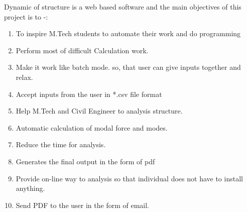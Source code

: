 Dynamic of structure is a web based software and the 
main objectives of this project is to -:
\begin{enumerate}
\item To inspire M.Tech students to automate their work and do programming 
\item Perform most of difficult Calculation work.
\item Make it work like batch mode. so, that user can give inputs 
together and relax.
\item Accept inputs from the user in *.csv file format
\item Help M.Tech and Civil Engineer to analysis structure.
\item Automatic calculation of modal force and modes.
\item Reduce the time for analysis.
\item Generates the final output in the form of pdf
\item Provide on-line way to analysis so that individual does not have to 
install anything.
\item Send PDF to the user in the form of email.
\end{enumerate}

